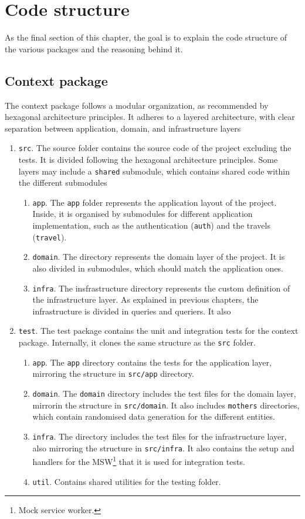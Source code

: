 \documentclass[./memory.tex]{subfiles}
\begin{document}
\section{Code structure}
As the final section of this chapter, the goal is to explain the code structure
of the various packages and the reasoning behind it.
\subsection{Context package}
The context package follows a modular organization, as recommended by hexagonal
architecture principles. It adheres to a layered architecture, with clear
separation between application, domain, and infrastructure layers
\begin{enumerate}[label = -]
	\item\texttt{src}. The source folder contains the source code of the project
	excluding the tests. It is divided following the hexagonal architecture
	principles. Some layers may include a \texttt{shared} submodule, which contains
	shared code within the different submodules
	\begin{enumerate}[label = -]
		\item\texttt{app}. The \texttt{app} folder represents the application
		layout of the project. Inside, it is organised by submodules for
		different application implementation, such as the authentication
		(\texttt{auth}) and the travels (\texttt{travel}).
		\item\texttt{domain}. The directory represents the domain layer of the
		project. It is also divided in submodules, which should match the
		application ones.
		\item\texttt{infra}. The insfrastructure directory represents the custom
		definition of the infrastructure layer. As explained in previous
		chapters, the infrastructure is divided in queries and queriers. It also
	\end{enumerate}
	\item\texttt{test}. The test package contains the unit and integration tests
	for the context package. Internally, it clones the same structure as the
	\texttt{src} folder.
	\begin{enumerate}[label = -]
		\item\texttt{app}. The \texttt{app} directory contains the tests for the
		application layer, mirroring the structure in \texttt{src/app}
		directory.
		\item\texttt{domain}. The \texttt{domain} directory includes the test
		files for the domain layer, mirrorin the structure in
		\texttt{src/domain}. It also includes \texttt{mothers} directories,
		which contain randomised data generation for the different entities.
		\item\texttt{infra}. The directory includes the test files for the
		infrastructure layer, also mirroring the structure in
		\texttt{src/infra}. It also contains the setup and handlers for the
		MSW\footnote{Mock service worker.} that it is used for integration
		tests.
		\item\texttt{util}. Contains shared utilities for the testing folder.
	\end{enumerate}
\end{enumerate}
\end{document}
